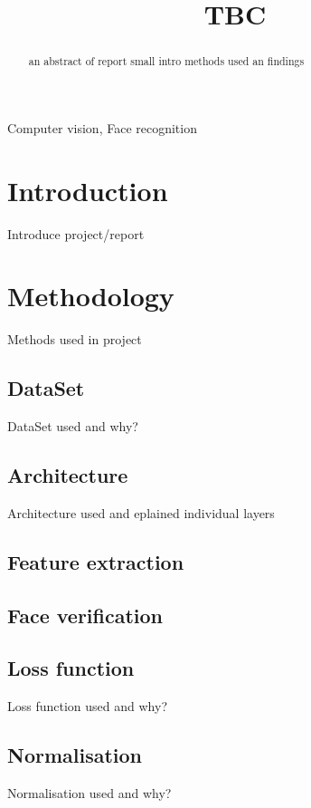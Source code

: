 \documentclass{article}
\title{TBC}
\begin{document}
%
\maketitle
%
\begin{abstract}
an abstract of report small intro methods used an findings
\end{abstract}
%
\begin{keywords}
Computer vision, Face recognition
\end{keywords}
%
\section{Introduction}
\label{sec:intro}
Introduce project/report


\section{Methodology}
\label{sec:method}
Methods used in project\cite{taigman_deepface_2014}

 \subsection{DataSet}
\label{ssec:data}
DataSet used and why?\cite{wang_deep_2021}


 \subsection{Architecture}
\label{ssec:arch}
Architecture used and eplained individual layers

 \subsection{Feature extraction}
\label{ssec:featex}

 \subsection{Face verification}
\label{ssec:face}

 \subsection{Loss function}
\label{ssec:loss}
Loss function used and why?

\subsection{Normalisation}
\label{ssec:norm}
Normalisation used and why?
\end{document}
